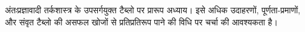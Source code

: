 \documentclass[../../../include/open-logic-chapter]{subfiles}
\begin{document}

\begin{editorial}
  अंतःप्रज्ञावादी तर्कशास्त्र के उपसर्गयुक्त टैब्लो पर प्रारूप अध्याय। इसे
  अधिक उदाहरणों, पूर्णता-प्रमाणों, और संवृत टैब्लो की असफल खोजों से
  प्रतिप्रतिरूप पाने की विधि पर चर्चा की आवश्यकता है।
\end{editorial}


\OLEndChapterHook
\end{document}

